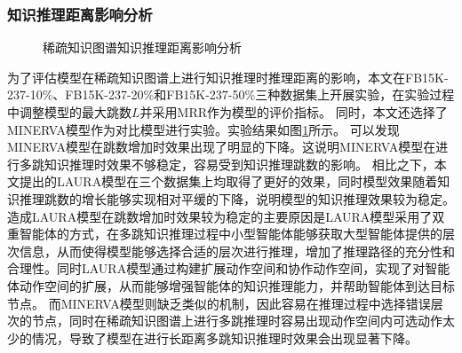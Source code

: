 \documentclass[algorithmlist, AutoFakeBold, AutoFakeSlant, figurelist, tablelist, nomlist, engineering]{seuthesix}
\begin{document}
\subsubsection{知识推理距离影响分析}
\begin{figure}[t]
  \centering
  \caption{稀疏知识图谱知识推理距离影响分析}
  \label{Experiment2_multihop}
\end{figure}
为了评估模型在稀疏知识图谱上进行知识推理时推理距离的影响，本文在FB15K-237-10\%、FB15K-237-20\%和FB15K-237-50\%三种数据集上开展实验，在实验过程中调整模型的最大跳数$L$并采用MRR作为模型的评价指标。
同时，本文还选择了MINERVA模型作为对比模型进行实验。实验结果如图\ref{Experiment2_multihop}所示。
可以发现MINERVA模型在跳数增加时效果出现了明显的下降。这说明MINERVA模型在进行多跳知识推理时效果不够稳定，容易受到知识推理跳数的影响。
相比之下，本文提出的LAURA模型在三个数据集上均取得了更好的效果，同时模型效果随着知识推理跳数的增长能够实现相对平缓的下降，说明模型的知识推理效果较为稳定。
造成LAURA模型在跳数增加时效果较为稳定的主要原因是LAURA模型采用了双重智能体的方式，在多跳知识推理过程中小型智能体能够获取大型智能体提供的层次信息，从而使得模型能够选择合适的层次进行推理，增加了推理路径的充分性和合理性。同时LAURA模型通过构建扩展动作空间和协作动作空间，实现了对智能体动作空间的扩展，从而能够增强智能体的知识推理能力，并帮助智能体到达目标节点。
而MINERVA模型则缺乏类似的机制，因此容易在推理过程中选择错误层次的节点，同时在稀疏知识图谱上进行多跳推理时容易出现动作空间内可选动作太少的情况，导致了模型在进行长距离多跳知识推理时效果会出现显著下降。
\end{document}
